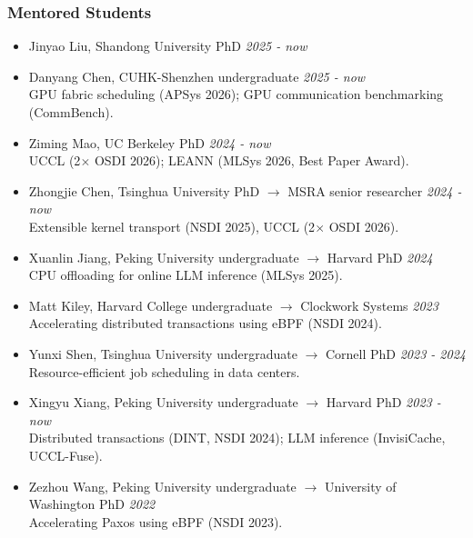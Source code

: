 \documentclass[letterpaper, 11pt]{article}
\newcommand\toRight{\hspace*{0pt}\hfill}
\begin{document}
\subsubsection*{Mentored Students}
\vspace{-0.1cm}

\begin{itemize}
    \setlength{\itemsep}{0pt}%
    \setlength{\parskip}{5pt}%

\item Jinyao Liu, Shandong University PhD \toRight \textit{2025 - now}

\item Danyang Chen, CUHK-Shenzhen undergraduate \toRight \textit{2025 - now} \\
        GPU fabric scheduling (APSys 2026); GPU communication benchmarking (CommBench).

\item Ziming Mao, UC Berkeley PhD \toRight \textit{2024 - now} \\
        UCCL (2$\times$ OSDI 2026); LEANN (MLSys 2026, Best Paper Award).

\item Zhongjie Chen, Tsinghua University PhD $\to$ MSRA senior researcher \toRight \textit{2024 - now} \\
        Extensible kernel transport (NSDI 2025), UCCL (2$\times$ OSDI 2026).

\item Xuanlin Jiang, Peking University undergraduate $\to$ Harvard PhD  \toRight \textit{2024} \\
        CPU offloading for online LLM inference (MLSys 2025).

\item Matt Kiley, Harvard College undergraduate $\to$ Clockwork Systems \toRight \textit{2023} \\
        Accelerating distributed transactions using eBPF (NSDI 2024).

\item Yunxi Shen, Tsinghua University undergraduate $\to$ Cornell PhD  \toRight \textit{2023 - 2024} \\
        Resource-efficient job scheduling in data centers.

\item Xingyu Xiang, Peking University undergraduate $\to$ Harvard PhD  \toRight \textit{2023 - now} \\
        Distributed transactions (DINT, NSDI 2024); LLM inference (InvisiCache, UCCL-Fuse).

\item Zezhou Wang, Peking University undergraduate $\to$ University of Washington PhD \toRight \textit{2022} \\
        Accelerating Paxos using eBPF (NSDI 2023).
\end{itemize}
\end{document}
